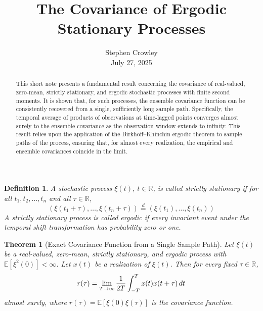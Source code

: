 \documentclass{article}
\newcommand{\tmaffiliation}[1]{\\ #1}
\newcommand{\tmem}[1]{{\em #1\/}}
\newtheorem{definition}{Definition}
{\theorembodyfont{\rmfamily}\newtheorem{remark}{Remark}}
\newtheorem{theorem}{Theorem}
\begin{document}
\title{The Covariance of Ergodic Stationary Processes}

\author{
  Stephen Crowley
  \tmaffiliation{July 27, 2025}
}

\maketitle

\begin{abstract}
  This short note presents a fundamental result concerning the covariance of
  real-valued, zero-mean, strictly stationary, and ergodic stochastic
  processes with finite second moments. It is shown that, for such processes,
  the ensemble covariance function can be consistently recovered from a
  single, sufficiently long sample path. Specifically, the temporal average of
  products of observations at time-lagged points converges almost surely to
  the ensemble covariance as the observation window extends to infinity. This
  result relies upon the application of the Birkhoff--Khinchin ergodic theorem
  to sample paths of the process, ensuring that, for almost every realization,
  the empirical and ensemble covariances coincide in the limit. 
\end{abstract}

\begin{definition}
  A stochastic process $\xi (t)$, $t \in \mathbb{R}$, is called
  {\tmem{strictly stationary}} if for all $t_1, t_2, \ldots, t_n$ and all
  $\tau \in \mathbb{R}$,
  \begin{equation}
    (\xi (t_1 + \tau), \ldots, \xi (t_n + \tau)) \overset{d}{=} (\xi (t_1),
    \ldots, \xi (t_n))
  \end{equation}
  A strictly stationary process is called {\tmem{ergodic}} if every invariant
  event under the temporal shift transformation has probability zero or one.
\end{definition}

\begin{theorem}[Exact Covariance Function from a Single Sample Path]
  \label{thm:covariance}Let $\xi (t)$ be a real-valued, zero-mean, strictly
  stationary, and ergodic process with $\mathbb{E} [\xi^2 (0)] < \infty$. Let
  $x (t)$ be a realization of $\xi (t)$. Then for every fixed $\tau \in
  \mathbb{R}$,
  \begin{equation}
    r (\tau) = \lim_{T \to \infty}  \frac{1}{2 T}  \int_{- T}^T x (t) x (t +
    \tau)  \hspace{0.17em} dt
  \end{equation}
  almost surely, where $r (\tau) =\mathbb{E} [\xi (0) \xi (\tau)]$ is the
  covariance function.
\end{theorem}
\end{document}
